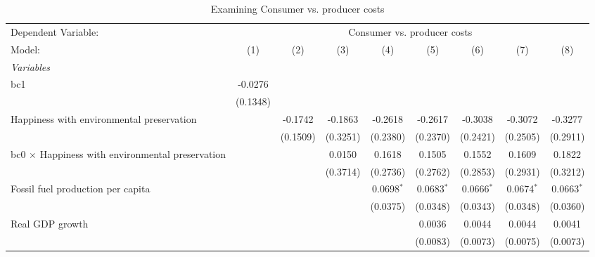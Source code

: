
\begin{table}[htbp]
   \caption{Examining Consumer vs. producer costs}
   \centering
   \begin{tabular}{lcccccccc}
      \tabularnewline \midrule \midrule
      Dependent Variable: & \multicolumn{8}{c}{Consumer vs. producer costs}\\
      Model:                                                  & (1)      & (2)      & (3)      & (4)          & (5)          & (6)          & (7)          & (8)\\  
      \midrule
      \emph{Variables}\\
      bc1                                                     & -0.0276  &          &          &              &              &              &              &   \\   
                                                              & (0.1348) &          &          &              &              &              &              &   \\   
      Happiness with environmental preservation               &          & -0.1742  & -0.1863  & -0.2618      & -0.2617      & -0.3038      & -0.3072      & -0.3277\\   
                                                              &          & (0.1509) & (0.3251) & (0.2380)     & (0.2370)     & (0.2421)     & (0.2505)     & (0.2911)\\   
      bc0 $\times$ Happiness with environmental preservation  &          &          & 0.0150   & 0.1618       & 0.1505       & 0.1552       & 0.1609       & 0.1822\\   
                                                              &          &          & (0.3714) & (0.2736)     & (0.2762)     & (0.2853)     & (0.2931)     & (0.3212)\\   
      Fossil fuel production per capita                       &          &          &          & 0.0698$^{*}$ & 0.0683$^{*}$ & 0.0666$^{*}$ & 0.0674$^{*}$ & 0.0663$^{*}$\\   
                                                              &          &          &          & (0.0375)     & (0.0348)     & (0.0343)     & (0.0348)     & (0.0360)\\   
      Real GDP growth                                         &          &          &          &              & 0.0036       & 0.0044       & 0.0044       & 0.0041\\   
                                                              &          &          &          &              & (0.0083)     & (0.0073)     & (0.0075)     & (0.0073)\\   

\end{tabular}
\end{table}
